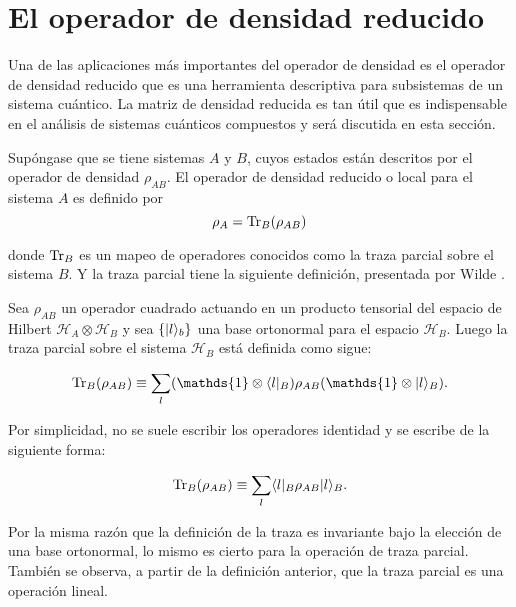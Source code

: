 \section{El operador de densidad reducido}

Una de las aplicaciones más importantes del operador de densidad es el operador de densidad reducido que es una herramienta descriptiva para subsistemas de un sistema cuántico. La matriz de densidad reducida es tan útil que es indispensable en el análisis de sistemas cuánticos compuestos y será discutida en esta sección.


Supóngase que se tiene sistemas $A$ y $B$, cuyos estados están descritos por el operador de densidad $\rho_{AB}$. El operador de densidad reducido o local para el sistema $A$ es definido por 
\begin{equation}
	\rho_A={\rm Tr}_B(\rho_{AB})
\end{equation}

donde ${\rm Tr}_B$ es un mapeo de operadores conocidos como la traza parcial sobre el sistema $B$. Y la traza parcial tiene la siguiente definición, presentada por Wilde {\cite{wilde2011classical}}.





\begin{definition}
	
	Sea  $ \rho_{AB}$ un operador cuadrado actuando en un producto tensorial del espacio de Hilbert $\mathcal{H}_A \otimes \mathcal{ H}_B$ y sea $\{|l\rangle_b\}$ una base ortonormal para el espacio $\mathcal{H}_B$. Luego la traza parcial sobre el sistema $\mathcal{H}_B$ está definida como sigue:
	
	\begin{equation}
		\tr_B(\rho_{AB})\equiv\sum_{l} (\mathds{1}\otimes\la l|_B)\rho_{AB}(\mathds{1}\otimes|l\ra_B).	
	\end{equation}

Por simplicidad, no se suele escribir los operadores identidad y se escribe de la siguiente forma:

\begin{equation}
	{\rm Tr}_B(\rho_{AB})\equiv\sum_{l} \langle l|_B\rho_{AB}|l\rangle_B.
\end{equation}

	\end{definition}


Por la misma razón que la definición de la traza es invariante bajo la elección de una base ortonormal, lo mismo es cierto para la operación de traza parcial. También se observa, a partir de la definición anterior, que la traza parcial es una operación lineal.


